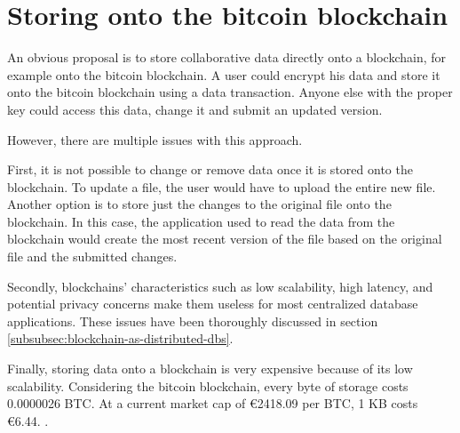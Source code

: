 \section{Storing onto the bitcoin blockchain}
\label{store-on-bitcoin}

\iffalse
- very obvious solution would be to store data directly onto a blockchain, eg. the bitcoin blockchain. you would just put all the data, properly encrypted, directly onto the blockchain and it is stored

\fi

An obvious proposal is to store collaborative data directly onto a blockchain, for example onto the bitcoin blockchain. A user could encrypt his data and store it onto the bitcoin blockchain using a data transaction. Anyone else with the proper key could access this data, change it and submit an updated version.

\iffalse
- various issues arise: 
  - basic functionality is missing that several applications need: you are not able to change or remove data once stored data, to update a file you would have to store the entire file again or store just the change and have your application reading the blockchain create the most recent file.
  - as mentioned in section \ref{subsubsec:blockchain-as-distributed-dbs}, blockchains deal with low scalability, high latency and potential privacy concerns.
  - insanely expensive: 0.0000026 BTC per byte \cite{bitcoin-transaction-fee}. At a current market cap of €2418.09 per BTC, the cost of storage is €6.44 per KB. \cite{bitcoin-market-cap}
\fi

However, there are multiple issues with this approach. 

First, it is not possible to change or remove data once it is stored onto the blockchain. To update a file, the user would have to upload the entire new file. Another option is to store just the changes to the original file onto the blockchain. In this case, the application used to read the data from the blockchain would create the most recent version of the file based on the original file and the submitted changes. 

Secondly, blockchains' characteristics such as low scalability, high latency, and potential privacy concerns make them useless for most centralized database applications. These issues have been thoroughly discussed in section \ref{subsubsec:blockchain-as-distributed-dbs}.

Finally, storing data onto a blockchain is very expensive because of its low scalability. Considering the bitcoin blockchain, every byte of storage costs 0.0000026 BTC\cite{bitcoin-transaction-fee}. At a current market cap of €2418.09 per BTC, 1 KB costs €6.44. \cite{bitcoin-market-cap}.

